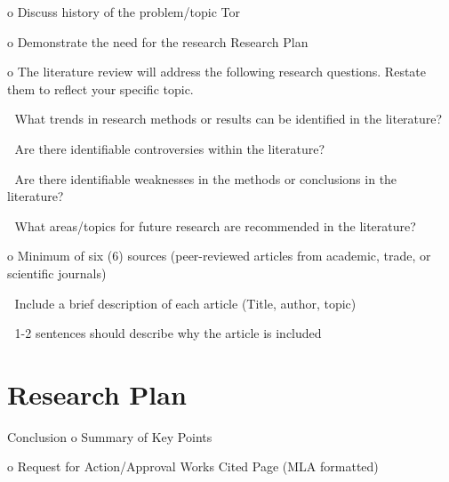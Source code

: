 \documentclass[letterpaper,11pt]{texMemo}
\begin{document}
    o Discuss history of the problem/topic
    Tor 

    o Demonstrate the need for the research
    Research Plan

    o The literature review will address the following research questions. Restate
    them to reflect your specific topic.

         What trends in research methods or results can be identified in the
        literature?

         Are there identifiable controversies within the literature?

         Are there identifiable weaknesses in the methods or conclusions in the
        literature?

         What areas/topics for future research are recommended in the
        literature?

    o Minimum of six (6) sources (peer-reviewed articles from academic, trade, or
    scientific journals)

         Include a brief description of each article (Title, author, topic)

         1-2 sentences should describe why the article is included

\section*{Research Plan}
Conclusion
    o Summary of Key Points

    o Request for Action/Approval
    Works Cited Page (MLA formatted)

\nocite{*}
\end{document}
